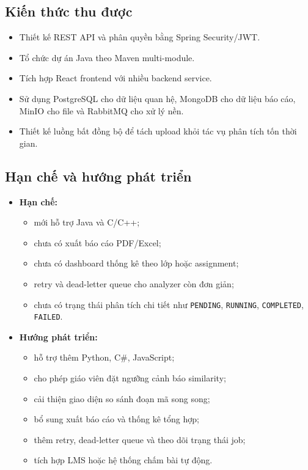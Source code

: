\documentclass[12pt,a4paper]{article}
\begin{document}
\subsection{Kiến thức thu được}

\begin{itemize}
    \item Thiết kế REST API và phân quyền bằng Spring Security/JWT.
    \item Tổ chức dự án Java theo Maven multi-module.
    \item Tích hợp React frontend với nhiều backend service.
    \item Sử dụng PostgreSQL cho dữ liệu quan hệ, MongoDB cho dữ liệu báo cáo, MinIO cho file và RabbitMQ cho xử lý nền.
    \item Thiết kế luồng bất đồng bộ để tách upload khỏi tác vụ phân tích tốn thời gian.
\end{itemize}

\subsection{Hạn chế và hướng phát triển}

\begin{itemize}
    \item \textbf{Hạn chế:}
    \begin{itemize}
        \item mới hỗ trợ Java và C/C++;
        \item chưa có xuất báo cáo PDF/Excel;
        \item chưa có dashboard thống kê theo lớp hoặc assignment;
        \item retry và dead-letter queue cho analyzer còn đơn giản;
        \item chưa có trạng thái phân tích chi tiết như \texttt{PENDING}, \texttt{RUNNING}, \texttt{COMPLETED}, \texttt{FAILED}.
    \end{itemize}
    \item \textbf{Hướng phát triển:}
    \begin{itemize}
        \item hỗ trợ thêm Python, C\#, JavaScript;
        \item cho phép giáo viên đặt ngưỡng cảnh báo similarity;
        \item cải thiện giao diện so sánh đoạn mã song song;
        \item bổ sung xuất báo cáo và thống kê tổng hợp;
        \item thêm retry, dead-letter queue và theo dõi trạng thái job;
        \item tích hợp LMS hoặc hệ thống chấm bài tự động.
    \end{itemize}
\end{itemize}
\end{document}
